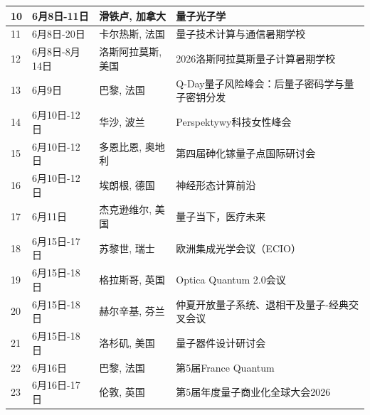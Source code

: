 \documentclass[12pt,a4paper]{ctexart}
\begin{document}
{\begin{longtable}{C{0.8cm}L{2.5cm}L{3cm}L{7cm}}
        10 & 6月8日-11日 & 滑铁卢, 加拿大 & 量子光子学 \\
        \midrule[0.05pt]
        
        11 & 6月8日-20日 & 卡尔热斯, 法国 & 量子技术计算与通信暑期学校 \\
        \midrule[0.05pt]
        
        12 & 6月8日-8月14日 & 洛斯阿拉莫斯, 美国 & 2026洛斯阿拉莫斯量子计算暑期学校 \\
        \midrule[0.05pt]
        
        13 & 6月9日 & 巴黎, 法国 & Q-Day量子风险峰会：后量子密码学与量子密钥分发 \\
        \midrule[0.05pt]
        
        14 & 6月10日-12日 & 华沙, 波兰 & Perspektywy科技女性峰会 \\
        \midrule[0.05pt]
        
        15 & 6月10日-12日 & 多恩比恩, 奥地利 & 第四届砷化镓量子点国际研讨会 \\
        \midrule[0.05pt]
        
        16 & 6月10日-12日 & 埃朗根, 德国 & 神经形态计算前沿 \\
        \midrule[0.05pt]
        
        17 & 6月11日 & 杰克逊维尔, 美国 & 量子当下，医疗未来 \\
        \midrule[0.05pt]
        
        18 & 6月15日-17日 & 苏黎世, 瑞士 & 欧洲集成光学会议（ECIO） \\
        \midrule[0.05pt]
        
        19 & 6月15日-18日 & 格拉斯哥, 英国 & Optica Quantum 2.0会议 \\
        \midrule[0.05pt]
        
        20 & 6月15日-18日 & 赫尔辛基, 芬兰 & 仲夏开放量子系统、退相干及量子-经典交叉会议 \\
        \midrule[0.05pt]
        
        21 & 6月15日-18日 & 洛杉矶, 美国 & 量子器件设计研讨会 \\
        \midrule[0.05pt]
        
        22 & 6月16日 & 巴黎, 法国 & 第5届France Quantum \\
        \midrule[0.05pt]
        
        23 & 6月16日-17日 & 伦敦, 英国 & 第5届年度量子商业化全球大会2026 \\
        \midrule[0.05pt]
        

\end{longtable}}
\end{document}
